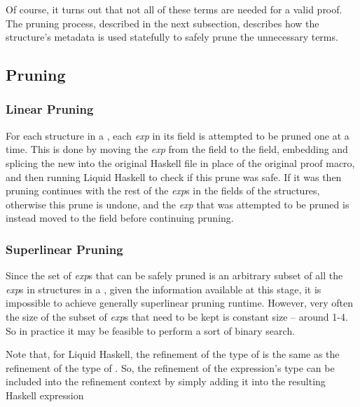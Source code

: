 Of course, it turns out that not all of these terms are needed for a valid proof.
The pruning process, described in the next subsection, describes how the  structure's metadata is used statefully to safely prune the unnecessary terms.
  
\subsection{Pruning}

\subsubsection{Linear Pruning}

For each  structure in a \LangBTerm, each \textit{exp} in its  field is attempted to be pruned one at a time.
This is done by moving the \textit{exp} from the  field to the  field, embedding and splicing the new \LangBTerm into the original Haskell file in place of the original proof macro, and then running Liquid Haskell to check if this prune was safe.
If it was then pruning continues with the rest of the \textit{exp}s in the  fields of the  structures, otherwise this prune is undone, and the \textit{exp} that was attempted to be pruned is instead moved to the  field before continuing pruning.

\subsubsection{Superlinear Pruning}

Since the set of \textit{exp}s that can be safely pruned is an arbitrary subset of all the \textit{exp}s in  structures in a \LangBTerm, given the information available at this stage, it is impossible to achieve generally superlinear pruning runtime. 
However, very often the size of the subset of \textit{exp}s that need to be kept is constant size -- around 1-4.
So in practice it may be feasible to perform a sort of binary search.

% 
% 

Note that, for Liquid Haskell, the refinement of the type of  is the same as the refinement of the type of .
So, the refinement of the expression's type can be included into the refinement context by simply adding it into the resulting Haskell expression


